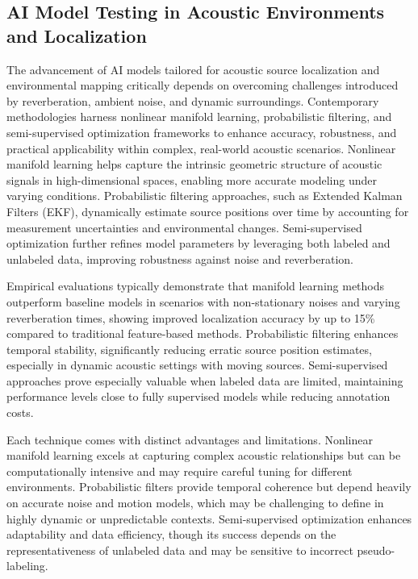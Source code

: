 \documentclass[sigconf]{acmart}
\begin{document}
\subsection{AI Model Testing in Acoustic Environments and Localization}

The advancement of AI models tailored for acoustic source localization and environmental mapping critically depends on overcoming challenges introduced by reverberation, ambient noise, and dynamic surroundings. Contemporary methodologies harness nonlinear manifold learning, probabilistic filtering, and semi-supervised optimization frameworks to enhance accuracy, robustness, and practical applicability within complex, real-world acoustic scenarios. Nonlinear manifold learning helps capture the intrinsic geometric structure of acoustic signals in high-dimensional spaces, enabling more accurate modeling under varying conditions. Probabilistic filtering approaches, such as Extended Kalman Filters (EKF), dynamically estimate source positions over time by accounting for measurement uncertainties and environmental changes. Semi-supervised optimization further refines model parameters by leveraging both labeled and unlabeled data, improving robustness against noise and reverberation.

Empirical evaluations typically demonstrate that manifold learning methods outperform baseline models in scenarios with non-stationary noises and varying reverberation times, showing improved localization accuracy by up to 15\% compared to traditional feature-based methods. Probabilistic filtering enhances temporal stability, significantly reducing erratic source position estimates, especially in dynamic acoustic settings with moving sources. Semi-supervised approaches prove especially valuable when labeled data are limited, maintaining performance levels close to fully supervised models while reducing annotation costs.

Each technique comes with distinct advantages and limitations. Nonlinear manifold learning excels at capturing complex acoustic relationships but can be computationally intensive and may require careful tuning for different environments. Probabilistic filters provide temporal coherence but depend heavily on accurate noise and motion models, which may be challenging to define in highly dynamic or unpredictable contexts. Semi-supervised optimization enhances adaptability and data efficiency, though its success depends on the representativeness of unlabeled data and may be sensitive to incorrect pseudo-labeling.
\end{document}
